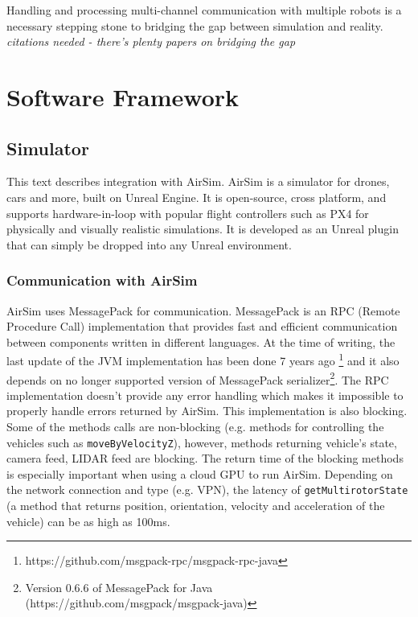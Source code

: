 \documentclass{article}
\begin{document}
Handling and processing multi-channel communication with multiple robots is a necessary stepping stone to bridging the gap between simulation and reality. \emph{citations needed - there's plenty papers on bridging the gap}




\section{Software Framework}

\subsection{Simulator}
This text describes integration with AirSim. AirSim is a simulator for drones, cars and more, built on Unreal Engine. It is open-source, cross platform, and supports hardware-in-loop with popular flight controllers such as PX4 for physically and visually realistic simulations. It is developed as an Unreal plugin that can simply be dropped into any Unreal environment. \cite{shah2018airsim}

\subsubsection{Communication with AirSim}
AirSim uses MessagePack \cite{messagepack} for communication. MessagePack is an RPC (Remote Procedure Call) implementation that provides fast and efficient communication between components written in different languages. At the time of writing, the last update of the JVM implementation has been done 7 years ago \footnote{https://github.com/msgpack-rpc/msgpack-rpc-java} and it also depends on no longer supported version of MessagePack serializer\footnote{Version 0.6.6 of MessagePack for Java (https://github.com/msgpack/msgpack-java)}. The RPC implementation doesn't provide any error handling which makes it impossible to properly handle errors returned by AirSim. This implementation is also blocking. Some of the methods calls are non-blocking (e.g. methods for controlling the vehicles such as \verb|moveByVelocityZ|), however, methods returning vehicle's state, camera feed, LIDAR feed are blocking. The return time of the blocking methods is especially important when using a cloud GPU to run AirSim. Depending on the network connection and type (e.g. VPN), the latency of \verb|getMultirotorState| (a method that returns position, orientation, velocity and acceleration of the vehicle) can be as high as 100ms.
\end{document}
